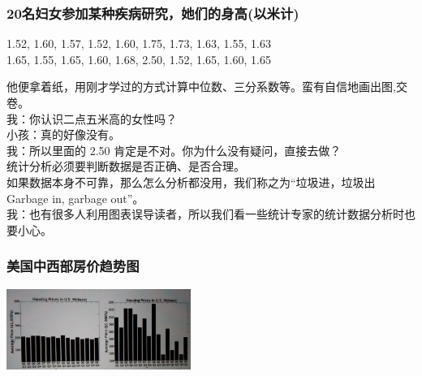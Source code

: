 \hypertarget{ux540dux5987ux5973ux53c2ux52a0ux67d0ux79cdux75beux75c5ux7814ux7a76ux5979ux4eecux7684ux8eabux9ad8ux4ee5ux7c73ux8ba1}{%
\subsubsection{20名妇女参加某种疾病研究，她们的身高(以米计)}\label{ux540dux5987ux5973ux53c2ux52a0ux67d0ux79cdux75beux75c5ux7814ux7a76ux5979ux4eecux7684ux8eabux9ad8ux4ee5ux7c73ux8ba1}}

1.52, 1.60, 1.57, 1.52, 1.60, 1.75, 1.73, 1.63, 1.55, 1.63\\
1.65, 1.55, 1.65, 1.60, 1.68, 2.50, 1.52, 1.65, 1.60, 1.65

他便拿着纸，用刚才学过的方式计算中位数、三分系数等。蛮有自信地画出图,交卷。\\
我：你认识二点五米高的女性吗？\\
小孩：真的好像没有。\\
我：所以里面的 2.50 肯定是不对。你为什么没有疑问，直接去做？\\
统计分析必须要判断数据是否正确、是否合理。\\
如果数据本身不可靠，那么怎么分析都没用，我们称之为“垃圾进，垃圾出 Garbage in, garbage out”。\\
我：也有很多人利用图表误导读者，所以我们看一些统计专家的统计数据分析时也要小心。\\

\hypertarget{ux7f8eux56fdux4e2dux897fux90e8ux623fux4ef7ux8d8bux52bfux56fe}{%
\subsubsection{美国中西部房价趋势图}\label{ux7f8eux56fdux4e2dux897fux90e8ux623fux4ef7ux8d8bux52bfux56fe}}


\includegraphics[width=6cm]{Stat_f22-1_11.png}\\



